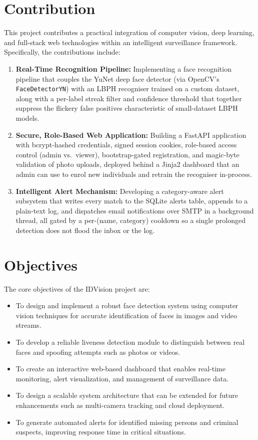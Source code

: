 \documentclass[11pt]{report}
\begin{document}
\section{Contribution}
This project contributes a practical integration of computer vision, deep learning, and full-stack web technologies within an intelligent surveillance framework. Specifically, the contributions include:
\begin{enumerate}
    \item \textbf{Real-Time Recognition Pipeline:} Implementing a face recognition pipeline that couples the YuNet deep face detector (via OpenCV's \texttt{FaceDetectorYN}) with an LBPH recogniser trained on a custom dataset, along with a per-label streak filter and confidence threshold that together suppress the flickery false positives characteristic of small-dataset LBPH models.
    \item \textbf{Secure, Role-Based Web Application:} Building a FastAPI application with bcrypt-hashed credentials, signed session cookies, role-based access control (admin vs.\ viewer), bootstrap-gated registration, and magic-byte validation of photo uploads, deployed behind a Jinja2 dashboard that an admin can use to enrol new individuals and retrain the recogniser in-process.
    \item \textbf{Intelligent Alert Mechanism:} Developing a category-aware alert subsystem that writes every match to the SQLite alerts table, appends to a plain-text log, and dispatches email notifications over SMTP in a background thread, all gated by a per-(name, category) cooldown so a single prolonged detection does not flood the inbox or the log.
\end{enumerate}

\section{Objectives}
The core objectives of the IDVision project are:
\begin{itemize}
    \item To design and implement a robust face detection system using computer vision techniques for accurate identification of faces in images and video streams.
    \item To develop a reliable liveness detection module to distinguish between real faces and spoofing attempts such as photos or videos.
    \item To create an interactive web-based dashboard that enables real-time monitoring, alert visualization, and management of surveillance data.
    \item To design a scalable system architecture that can be extended for future enhancements such as multi-camera tracking and cloud deployment.
    \item To generate automated alerts for identified missing persons and criminal suspects, improving response time in critical situations.
\end{itemize}
\end{document}
